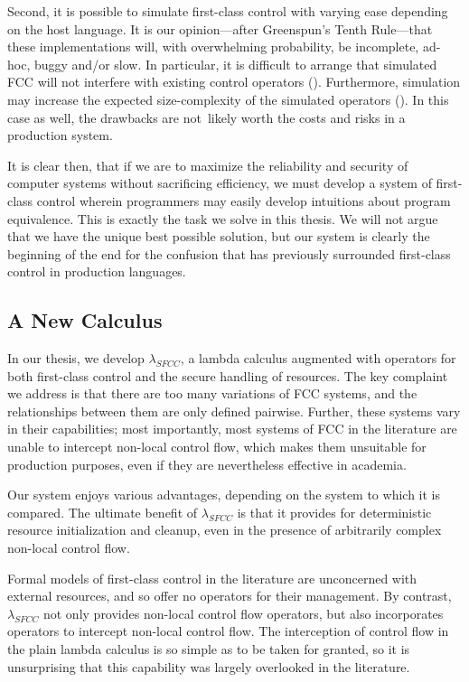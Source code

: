 \documentclass[11pt]{article}
\newcommand{\maybePage}{\newpage}
\begin{document}
Second, it is possible to simulate first-class control with varying ease depending on the host language.
It is our opinion---after Greenspun's Tenth Rule---that these implementations will, with overwhelming probability, be incomplete, ad-hoc, buggy and/or slow.
In particular, it is difficult to arrange that simulated FCC will not interfere with existing control operators (\cite{addDelimControlProduction}).
Furthermore, simulation may increase the expected size-complexity of the simulated operators (\cite{finalShiftForCallcc}).
In this case as well, the drawbacks are not~likely worth the costs and risks in a production system.


It is clear then, that if we are to maximize the reliability and security of computer systems without sacrificing efficiency, we must develop a system of first-class control wherein programmers may easily develop intuitions about program equivalence.
This is exactly the task we solve in this thesis.
We will not argue that we have the unique best possible solution, but our system is clearly the beginning of the end for the confusion that has previously surrounded first-class control in production languages.

\maybePage
\subsection{A New Calculus}

In our thesis, we develop $\lambda_{SFCC}$, a lambda calculus augmented with operators for both first-class control and the secure handling of resources.
The key complaint we address is that there are too many variations of FCC systems, and the relationships between them are only defined pairwise.
Further, these systems vary in their capabilities; most importantly, most systems of FCC in the literature are unable to intercept non-local control flow, which makes them unsuitable for production purposes, even if they are nevertheless effective in academia.

Our system enjoys various advantages, depending on the system to which it is compared.
The ultimate benefit of $\lambda_{SFCC}$ is that it provides for deterministic resource initialization and cleanup, even in the presence of arbitrarily complex non-local control flow.

Formal models of first-class control in the literature are unconcerned with external resources, and so offer no operators for their management.
By contrast, $\lambda_{SFCC}$ not only provides non-local control flow operators, but also incorporates operators to intercept non-local control flow.
The interception of control flow in the plain lambda calculus is so simple as to be taken for granted, so it is unsurprising that this capability was largely overlooked in the literature.
\end{document}
